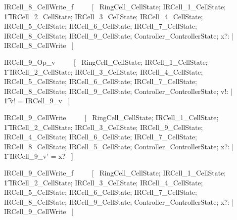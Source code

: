 \documentclass{article}
\begin{document}
\begin{zed}
IRCell\_8\_CellWrite\_f ~~~~ [~ 
    \Xi RingCell\_CellState; 
    \Xi IRCell\_1\_CellState; \\
    \t1 \Xi IRCell\_2\_CellState; 
    \Xi IRCell\_3\_CellState;
    \Xi IRCell\_4\_CellState; 
    \Xi IRCell\_5\_CellState; 
    \Xi IRCell\_6\_CellState; 
    \Xi IRCell\_7\_CellState; 
    \Xi IRCell\_8\_CellState; 
    \Xi IRCell\_9\_CellState; 
    \Xi Controller\_ControllerState; 
    x?: \nat | \\
    \lnot \pre IRCell\_8\_CellWrite ~] \\
\end{zed}
\begin{zed}
IRCell\_9\_Op\_v ~~~~ [~ 
    \Xi RingCell\_CellState; 
    \Xi IRCell\_1\_CellState; \\
    \t1 \Xi IRCell\_2\_CellState; 
    \Xi IRCell\_3\_CellState;
    \Xi IRCell\_4\_CellState; 
    \Xi IRCell\_5\_CellState; 
    \Xi IRCell\_6\_CellState; 
    \Xi IRCell\_7\_CellState; 
    \Xi IRCell\_8\_CellState; 
    \Xi IRCell\_9\_CellState; 
    \Xi Controller\_ControllerState; v!: \nat | \\
    \t1 v! = IRCell\_9\_v ~] \\
\end{zed}

\begin{zed}
IRCell\_9\_CellWrite ~~~~ [~ 
    \Xi RingCell\_CellState; 
    \Xi IRCell\_1\_CellState; \\
    \t1 \Xi IRCell\_2\_CellState; 
    \Xi IRCell\_3\_CellState; 
    \Delta IRCell\_9\_CellState;
    \Xi IRCell\_4\_CellState; 
    \Xi IRCell\_6\_CellState; 
    \Xi IRCell\_7\_CellState; 
    \Xi IRCell\_8\_CellState; 
    \Xi IRCell\_5\_CellState; 
    \Xi Controller\_ControllerState; 
    x?: \nat | \\
    \t1 IRCell\_9\_v' = x? ~] \\
\end{zed}

\begin{zed}
IRCell\_9\_CellWrite\_f ~~~~ [~ 
    \Xi RingCell\_CellState; 
    \Xi IRCell\_1\_CellState; \\
    \t1 \Xi IRCell\_2\_CellState; 
    \Xi IRCell\_3\_CellState;
    \Xi IRCell\_4\_CellState; 
    \Xi IRCell\_5\_CellState; 
    \Xi IRCell\_6\_CellState; 
    \Xi IRCell\_7\_CellState; 
    \Xi IRCell\_8\_CellState; 
    \Xi IRCell\_9\_CellState; 
    \Xi Controller\_ControllerState; 
    x?: \nat | \\
    \lnot \pre IRCell\_9\_CellWrite ~] \\
\end{zed}
\end{document}
